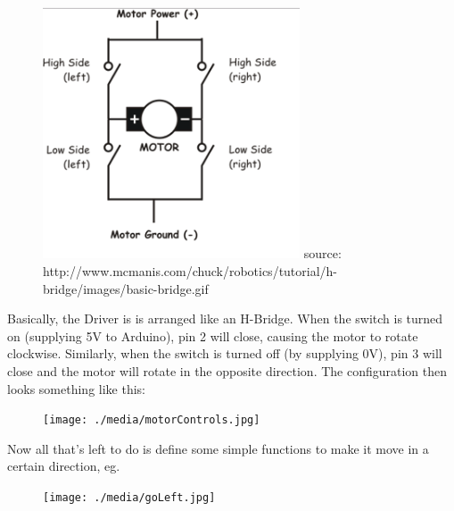 \documentclass[final,3p,times,twocolumn]{elsarticle}
\begin{document}
\begin{figure}[h!]
\includegraphics[trim={0cm 0.5cm 0cm 0.1cm}, clip, width=3in]{./media/hBridge.jpg}
source: http://www.mcmanis.com/chuck/robotics/tutorial/h-bridge/images/basic-bridge.gif
\end{figure}
Basically, the Driver is is arranged like an H-Bridge. When the switch is turned on (supplying 5V to Arduino), pin 2 will close, causing the motor to rotate clockwise. Similarly, when the switch is turned off (by supplying 0V), pin 3 will close and the motor will rotate in the opposite direction.
The configuration then looks something like this:
\begin{figure}[h!]
\texttt{[image: ./media/motorControls.jpg]}
\end{figure}
Now all that's left to do is define some simple functions to make it move in a certain direction, eg.
\begin{figure}[h!]
\texttt{[image: ./media/goLeft.jpg]}
\end{figure}
\end{document}
